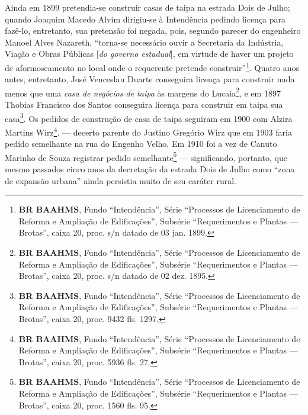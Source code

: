 



Ainda em 1899 pretendia-se construir casas de taipa na estrada Dois de Julho; quando Joaquim Macedo Alvim dirigiu-se à Intendência pedindo licença para fazê-lo, entretanto, sua pretensão foi negada, pois, segundo parecer do engenheiro Manoel Alves Nazareth, ``torna-se necessário ouvir a Secretaria da Indústria, Viação e Obras Públicas [\textit{do governo estadual}], em virtude de haver um projeto de aformoseamento no local onde o requerente pretende construir''\footnote{\textbf{BR BAAHMS}, Fundo ``Intendência'', Série ``Processos de Licenciamento de Reforma e Ampliação de Edificações'', Subsérie ``Requerimentos e Plantas --- Brotas'', caixa 20, proc. s/n datado de 03 jan. 1899.}. Quatro anos antes, entretanto, José Venceslau Duarte conseguira licença para construir nada menos que uma \textit{casa de negócios de taipa} às margens do Lucaia\footnote{\textbf{BR BAAHMS}, Fundo ``Intendência'', Série ``Processos de Licenciamento de Reforma e Ampliação de Edificações'', Subsérie ``Requerimentos e Plantas --- Brotas'', caixa 20, proc. s/n datado de 02 dez. 1895.}, e em 1897 Thobias Francisco dos Santos conseguira licença para construir em taipa sua casa\footnote{\textbf{BR BAAHMS}, Fundo ``Intendência'', Série ``Processos de Licenciamento de Reforma e Ampliação de Edificações'', Subsérie ``Requerimentos e Plantas --- Brotas'', caixa 20, proc. 9432 fls. 1297.}. Os pedidos de construção de casa de taipa seguiram em 1900 com Alzira Martins Wirz\footnote{\textbf{BR BAAHMS}, Fundo ``Intendência'', Série ``Processos de Licenciamento de Reforma e Ampliação de Edificações'', Subsérie ``Requerimentos e Plantas --- Brotas'', caixa 20, proc. 5936 fls. 27.}. --- decerto parente do Justino Gregório Wirz que em 1903 faria pedido semelhante na rua do Engenho Velho. Em 1910 foi a vez de Canuto Marinho de Souza registrar pedido semelhante\footnote{\textbf{BR BAAHMS}, Fundo ``Intendência'', Série ``Processos de Licenciamento de Reforma e Ampliação de Edificações'', Subsérie ``Requerimentos e Plantas --- Brotas'', caixa 20, proc. 1560 fls. 95.} --- significando, portanto, que mesmo passados cinco anos da decretação da estrada Dois de Julho como ``zona de expansão urbana'' ainda persistia muito de seu caráter rural. 

